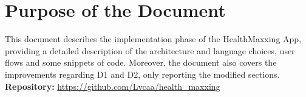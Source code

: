 \section{Purpose of the Document}
This document describes the implementation phase of the HealthMaxxing App, providing a detailed description of the architecture and language choices, user flows and some snippets of code. Moreover, the document also covers the improvements regarding D1 and D2, only reporting the modified sections.
\vspace{0.2cm}
\noindent\textbf{Repository:} \url{https://github.com/Lvcaa/health_maxxing}